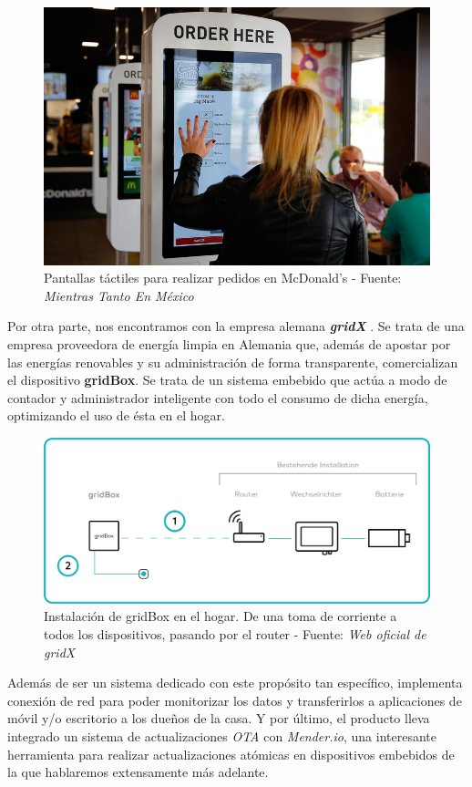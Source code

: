 \begin{figure}[H]
	\centering
	\includegraphics[width=0.75\linewidth]{imagenes/pedido-pantalla-tactil.jpg}
	\caption{Pantallas táctiles para realizar pedidos en McDonald's - Fuente: \textit{Mientras Tanto En México} \cite{mcdonalds-pantalla-tactil-pedidos}}
\end{figure}

Por otra parte, nos encontramos con la empresa alemana \textbf{\textit{gridX}} \cite{gridx}. Se trata de una empresa proveedora de energía limpia en Alemania que, además de apostar por las energías renovables y su administración de forma transparente, comercializan el dispositivo \textbf{gridBox}. Se trata de un sistema embebido que actúa a modo de contador y administrador inteligente con todo el consumo de dicha energía, optimizando el uso de ésta en el hogar.

\begin{figure}[H]
	\centering
	\includegraphics[width=0.75\linewidth]{imagenes/gridbox-utility.png}
	\caption{Instalación de gridBox en el hogar. De una toma de corriente a todos los dispositivos, pasando por el router - Fuente: \textit{Web oficial de gridX} \cite{gridbox}}
	\label{gridbox-installation}
\end{figure}

Además de ser un sistema dedicado con este propósito tan específico, implementa conexión de red para poder monitorizar los datos y transferirlos a aplicaciones de móvil y/o escritorio a los dueños de la casa. Y por último, el producto lleva integrado un sistema de actualizaciones \textit{OTA} con \textit{Mender.io}, una interesante herramienta para realizar actualizaciones atómicas en dispositivos embebidos de la que hablaremos extensamente más adelante.\\

